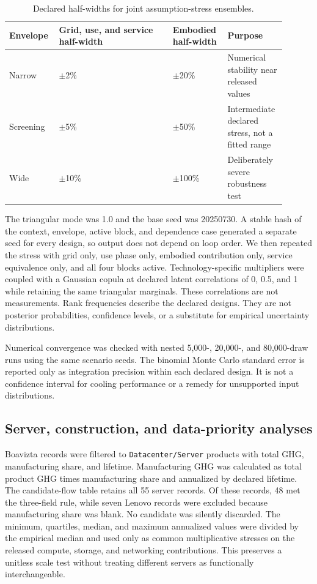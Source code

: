 \documentclass[review,12pt]{elsarticle}
\begin{document}
\begin{table}[!htbp]
\centering
\caption{Declared half-widths for joint assumption-stress ensembles.}
\small
\setlength{\tabcolsep}{3pt}
\begin{tabularx}{\textwidth}{>{\raggedright\arraybackslash}p{0.15\linewidth}>{\raggedright\arraybackslash}p{0.39\linewidth}>{\raggedright\arraybackslash}p{0.18\linewidth}>{\raggedright\arraybackslash}p{0.18\linewidth}}
\toprule
Envelope & Grid, use, and service half-\allowbreak{}width & Embodied half-\allowbreak{}width & Purpose \\
\midrule
Narrow & $\pm$2\% & $\pm$20\% & Numerical stability near released values \\
Screening & $\pm$5\% & $\pm$50\% & Intermediate declared stress, not a fitted range \\
Wide & $\pm$10\% & $\pm$100\% & Deliberately severe robustness test \\
\bottomrule
\end{tabularx}
\end{table}

The triangular mode was 1.0 and the base seed was 20250730. A stable hash of the context, envelope, active block, and dependence case generated a separate seed for every design, so output does not depend on loop order. We then repeated the stress with grid only, use phase only, embodied contribution only, service equivalence only, and all four blocks active. Technology-specific multipliers were coupled with a Gaussian copula at declared latent correlations of 0, 0.5, and 1 while retaining the same triangular marginals. These correlations are not measurements. Rank frequencies describe the declared designs. They are not posterior probabilities, confidence levels, or a substitute for empirical uncertainty distributions.

Numerical convergence was checked with nested 5,000-, 20,000-, and 80,000-draw runs using the same scenario seeds. The binomial Monte Carlo standard error is reported only as integration precision within each declared design. It is not a confidence interval for cooling performance or a remedy for unsupported input distributions.

\subsection{Server, construction, and data-priority analyses}
Boavizta records were filtered to \texttt{Datacenter/Server} products with total GHG, manufacturing share, and lifetime. Manufacturing GHG was calculated as total product GHG times manufacturing share and annualized by declared lifetime. The candidate-flow table retains all 55 server records. Of these records, 48 met the three-field rule, while seven Lenovo records were excluded because manufacturing share was blank. No candidate was silently discarded. The minimum, quartiles, median, and maximum annualized values were divided by the empirical median and used only as common multiplicative stresses on the released compute, storage, and networking contributions. This preserves a unitless scale test without treating different servers as functionally interchangeable.
\end{document}
